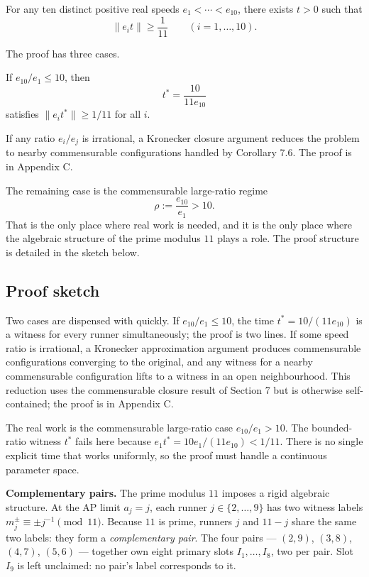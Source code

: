 \documentclass[12pt]{article}
\begin{document}
\begin{theorem}\label{t:11}
For any ten distinct positive real speeds
$e_1<\cdots<e_{10}$, there exists $t>0$ such that
\[
\|e_i t\|\ge \frac{1}{11}\qquad(i=1,\ldots,10).
\]

The proof has three cases.

\end{theorem}
\begin{theorem}\label{t:12}
If $e_{10}/e_1\le 10$, then
\[
t^*=\frac{10}{11e_{10}}
\]
satisfies $\|e_i t^*\|\ge 1/11$ for all $i$.
\end{theorem}

If any ratio $e_i/e_j$ is irrational, a Kronecker closure argument reduces the problem
to nearby commensurable configurations handled by Corollary 7.6. The proof
is in Appendix C.

The remaining case is the commensurable large-ratio regime
\[
\rho := \frac{e_{10}}{e_1} > 10.
\]
That is the only place where real work is needed, and it is the only place where the algebraic
structure of the prime modulus $11$ plays a role. The proof structure is detailed in the sketch below.

\subsection{Proof sketch}

Two cases are dispensed with quickly. If $e_{10}/e_1\le 10$, the time $t^*=10/(11e_{10})$
is a witness for every runner simultaneously; the proof is two lines. If some speed ratio
is irrational, a Kronecker approximation argument produces commensurable configurations
converging to the original, and any witness for a nearby commensurable configuration
lifts to a witness in an open neighbourhood. This reduction uses the commensurable closure
result of Section 7 but is otherwise self-contained; the proof is in Appendix C.

The real work is the commensurable large-ratio case $e_{10}/e_1>10$. The bounded-ratio
witness $t^*$ fails here because $e_1 t^*=10e_1/(11e_{10})<1/11$. There is no single
explicit time that works uniformly, so the proof must handle a continuous parameter space.

\textbf{Complementary pairs.}
The prime modulus $11$ imposes a rigid algebraic structure. At the AP limit $a_j=j$, each
runner $j\in\{2,\ldots,9\}$ has two witness labels $m_j^{\pm}\equiv\pm j^{-1}\pmod{11}$.
Because $11$ is prime, runners $j$ and $11-j$ share the same two labels: they form a
\emph{complementary pair}. The four pairs — $(2,9)$, $(3,8)$, $(4,7)$, $(5,6)$ — together
own eight primary slots $I_1,\ldots,I_8$, two per pair. Slot $I_9$ is left unclaimed:
no pair's label corresponds to it.
\end{document}
